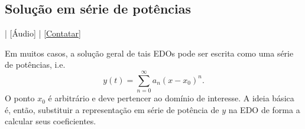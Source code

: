 \subsection{Solução em série de potências}

\begin{flushright}
  [Vídeo] | [Áudio] | \href{https://phkonzen.github.io/notas/contato.html}{[Contatar]}
\end{flushright}

Em muitos casos, a solução geral de tais EDOs pode ser escrita como uma série de potências, i.e.
\begin{equation}
  y(t) = \sum_{n=0}^{\infty} a_n(x-x_0)^n.
\end{equation}
O ponto $x_0$ é arbitrário e deve pertencer ao domínio de interesse. A ideia básica é, então, substituir a representação em série de potência de $y$ na EDO de forma a calcular seus coeficientes.


